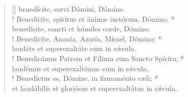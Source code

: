 \begin{verse}[\versewidth]
\vin benedícite, servi Dómini, Dómino.\\!
Benedícite, spíritus et ánimæ iustórum, Dómino; *\\
benedícite, sancti et húmiles corde, Dómino.\\!
\vin Benedícite, Ananía, Azaría, Mísael, Dómino; *\\
\vin laudáte et superexaltáte eum in s\'{æ}cula.\\!
Benedicámus Patrem et Fílium cum Sancto Spíritu; *\\
laudémus et superexaltémus eum in s\'{æ}cula.\\!
\vin Benedíctus es, Dómine, in firmaménto cæli; *\\
\vin et laudábilis et gloriósus et superexaltátus in s\'{æ}cula.\\
\end{verse}
\vspace{1cm}


